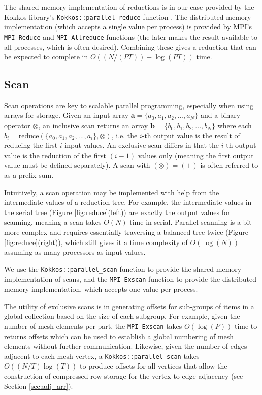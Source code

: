 The shared memory implementation of reductions is in our case
provided by the Kokkos library's \texttt{Kokkos::parallel\_reduce}
function \cite{edwards2013kokkos}.
The distributed memory implementation (which accepts a single value
per process) is provided by MPI's \texttt{MPI\_Reduce} and \texttt{MPI\_Allreduce}
functions (the later makes the result available to all processes, which is
often desired).
Combining these gives a reduction that can be expected to
complete in $O((N/(PT))+\log(PT))$ time.

\subsection{Scan}
\label{sec:scan}

Scan operations are key to scalable parallel programming, especially when using
arrays for storage.
Given an input array $\mathbf{a}=\{a_0, a_1, a_2, ..., a_N\}$ and a binary operator
$\otimes$, an inclusive scan returns an array $\mathbf{b}=\{b_0, b_1, b_2, ..., b_N\}$
where each $b_i=\text{reduce}(\{a_0, a_1, a_2, ..., a_i\}, \otimes)$, i.e. the
$i$-th output value is the result of reducing the first $i$ input values.
An exclusive scan differs in that the $i$-th output value is the reduction
of the first $(i-1)$ values only (meaning the first output value must be defined separately).
A scan with $(\otimes)=(+)$ is often referred to as a prefix sum.

Intuitively, a scan operation may be implemented with help from the intermediate
values of a reduction tree.
For example, the intermediate values in the serial tree (Figure \ref{fig:reduce}(left))
are exactly the output values for scanning, meaning a scan takes $O(N)$ time in serial.
Parallel scanning is a bit more complex and requires essentially traversing a
balanced tree twice (Figure \ref{fig:reduce}(right)), which still gives
it a time complexity of $O(\log(N))$ assuming as many processors as input values.

We use the \texttt{Kokkos::parallel\_scan} function to provide the shared
memory implementation of scans, and the \texttt{MPI\_Exscan} function
to provide the distributed memory implementation, which accepts one
value per process.

The utility of exclusive scans is in generating offsets for sub-groups of items in
a global collection based on the size of each subgroup.
For example, given the number of mesh elements per part, the \texttt{MPI\_Exscan}
takes $O(\log(P))$ time to returns offsets which can be used to establish a global
numbering of mesh elements without further communication.
Likewise, given the number of edges adjacent to each mesh vertex, a
\texttt{Kokkos::parallel\_scan} takes $O((N/T)\log(T))$ to produce offsets
for all vertices that allow the construction of compressed-row
storage for the vertex-to-edge adjacency (see Section \ref{sec:adj_arr}).

